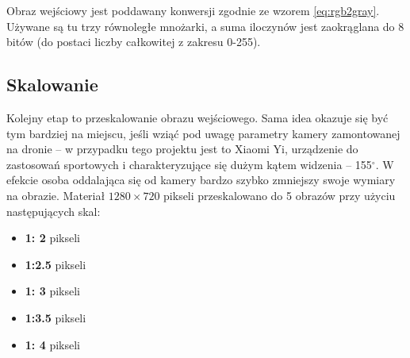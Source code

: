 Obraz wejściowy jest poddawany konwersji zgodnie ze wzorem \eqref{eq:rgb2gray}. 
Używane są tu trzy równoległe mnożarki, a suma iloczynów jest zaokrąglana do 8 bitów (do postaci liczby całkowitej z zakresu 0-255).

\subsection{Skalowanie}

Kolejny etap to przeskalowanie obrazu wejściowego. 
Sama idea okazuje się być tym bardziej na miejscu, jeśli wziąć pod uwagę parametry kamery zamontowanej na dronie -- w przypadku tego projektu jest to Xiaomi Yi, urządzenie do zastosowań sportowych i charakteryzujące się dużym kątem widzenia -- 155$^{\circ}$.
W efekcie osoba oddalająca się od kamery bardzo szybko zmniejszy swoje wymiary na obrazie. 
Materiał $1280\times 720$ pikseli przeskalowano do 5 obrazów przy użyciu następujących skal:
\begin{itemize}
	\item \textbf{1:  2}\tab{:} pikseli
	\item \textbf{1:2.5}\tab{:} pikseli	
	\item \textbf{1:  3}\tab{:} pikseli
	\item \textbf{1:3.5}\tab{:} pikseli
	\item \textbf{1:  4}\tab{:} pikseli
\end{itemize}

